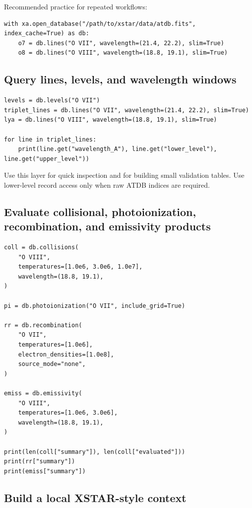 \documentclass[11pt]{article}
\begin{document}
Recommended practice for repeated workflows:

\begin{lstlisting}[style=ctpython]
with xa.open_database("/path/to/xstar/data/atdb.fits", index_cache=True) as db:
    o7 = db.lines("O VII", wavelength=(21.4, 22.2), slim=True)
    o8 = db.lines("O VIII", wavelength=(18.8, 19.1), slim=True)
\end{lstlisting}

\subsection{Query lines, levels, and wavelength windows}

\begin{lstlisting}[style=ctpython]
levels = db.levels("O VII")
triplet_lines = db.lines("O VII", wavelength=(21.4, 22.2), slim=True)
lya = db.lines("O VIII", wavelength=(18.8, 19.1), slim=True)

for line in triplet_lines:
    print(line.get("wavelength_A"), line.get("lower_level"), line.get("upper_level"))
\end{lstlisting}

Use this layer for quick inspection and for building small validation tables. Use lower-level record access only when raw ATDB indices are required.

\subsection{Evaluate collisional, photoionization, recombination, and emissivity products}

\begin{lstlisting}[style=ctpython]
coll = db.collisions(
    "O VIII",
    temperatures=[1.0e6, 3.0e6, 1.0e7],
    wavelength=(18.8, 19.1),
)

pi = db.photoionization("O VII", include_grid=True)

rr = db.recombination(
    "O VII",
    temperatures=[1.0e6],
    electron_densities=[1.0e8],
    source_mode="none",
)

emiss = db.emissivity(
    "O VIII",
    temperatures=[1.0e6, 3.0e6],
    wavelength=(18.8, 19.1),
)

print(len(coll["summary"]), len(coll["evaluated"]))
print(rr["summary"])
print(emiss["summary"])
\end{lstlisting}

\subsection{Build a local XSTAR-style context}
\end{document}

